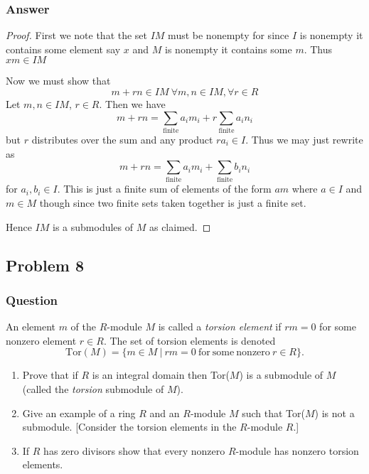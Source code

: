 \documentclass[12pt]{article}
\begin{document}
\subsubsection{Answer}
\begin{proof}
First we note that the set $I M $ must be nonempty for since $I$ is nonempty it contains some element say $x$ and $M$ is nonempty it contains some $m$. Thus $x m \in I M$
 
Now we must show that 
\[m + r n  \in I M\  \forall m,n \in I M , \forall r \in R \]
Let $m,n \in I M$, $r \in R$. Then we have 
\[m + r n = \sum_{\mathrm{finite}} a_i m_i + r \sum_{\mathrm{finite}} a_i n_i\]
but $r$ distributes over the sum and any product $r a_i \in I$. Thus we may just rewrite as 
\[m + r n = \sum_{\mathrm{finite}} a_i m_i +  \sum_{\mathrm{finite}} b_i n_i\] for $a_i, b_i \in I$. This is just a finite sum of elements of the form $am$ where $a \in I$ and $m \in M$ though since two finite sets taken together is just a finite set. 

Hence $I M$ is a submodules of $M$ as claimed.
\end{proof}

\subsection{Problem 8}

\subsubsection{Question}
An element $m$ of the $R$-module $M$ is called a \emph{torsion element} if $rm =0$ for some nonzero element $r \in R$. The set of torsion elements is denoted
\[\mathrm{Tor}(M) = \{m \in M \ | \ rm =0 \mathrm{\ for\ some\ nonzero\ } r \in R\}.\]
\begin{enumerate}
\item Prove that if $R$ is an integral domain then Tor($M$) is a submodule of $M$ (called the \emph{torsion} submodule of $M$).
\item Give an example of a ring $R$ and an $R$-module $M$ such that Tor($M$) is not a submodule. [Consider the torsion elements in the $R$-module $R$.]
\item If $R$ has zero divisors show that every nonzero $R$-module has nonzero torsion elements.
\end{enumerate}
\end{document}
